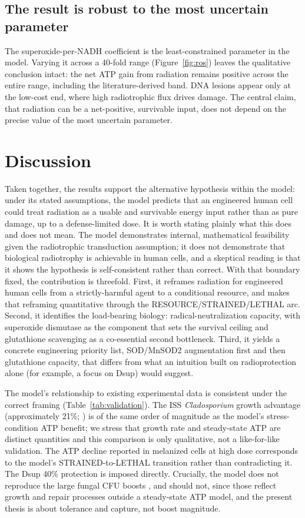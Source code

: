 \documentclass[11pt]{article}
\begin{document}
\subsection{The result is robust to the most uncertain parameter}

The superoxide-per-NADH coefficient is the least-constrained parameter in the
model. Varying it across a 40-fold range (Figure~\ref{fig:ros}) leaves the
qualitative conclusion intact: the net ATP gain from radiation remains positive
across the entire range, including the literature-derived band. DNA lesions appear
only at the low-cost end, where high radiotrophic flux drives damage. The central
claim, that radiation can be a net-positive, survivable input, does not depend on
the precise value of the most uncertain parameter.

\section{Discussion}

Taken together, the results support the alternative hypothesis within the model:
under its stated assumptions, the model predicts that an engineered human cell could
treat radiation as a usable and survivable energy input rather than as pure damage,
up to a defense-limited dose. It is worth stating plainly what this does and does
not mean. The model demonstrates internal, mathematical feasibility given the
radiotrophic transduction assumption; it does not demonstrate that biological
radiotrophy is achievable in human cells, and a skeptical reading is that it shows
the hypothesis is self-consistent rather than correct. With that boundary fixed,
the contribution is threefold. First, it reframes radiation for engineered human cells
from a strictly-harmful agent to a conditional resource, and makes that reframing
quantitative through the RESOURCE/STRAINED/LETHAL arc. Second, it identifies the
load-bearing biology: radical-neutralization capacity, with superoxide dismutase as
the component that sets the survival ceiling and glutathione scavenging as a
co-essential second bottleneck. Third, it yields a concrete engineering priority
list, SOD/MnSOD2 augmentation first and then glutathione capacity, that differs
from what an intuition built on radioprotection alone (for example, a focus on
Dsup) would suggest.

The model's relationship to existing experimental data is consistent under the
correct framing (Table~\ref{tab:validation}). The ISS \textit{Cladosporium} growth
advantage (approximately 21\%; \cite{shunk2022}) is of the same order of magnitude
as the model's stress-condition ATP benefit; we stress that growth rate and
steady-state ATP are distinct quantities and this comparison is only qualitative,
not a like-for-like validation. The ATP decline reported in melanized cells at
high dose \cite{bryan2011} corresponds to the model's STRAINED-to-LETHAL transition
rather than contradicting it. The Dsup 40\% protection \cite{hashimoto2016} is
imposed directly. Crucially, the model does not reproduce the large fungal CFU
boosts \cite{dadachova2007}, and should not, since those reflect growth and repair
processes outside a steady-state ATP model, and the present thesis is about
tolerance and capture, not boost magnitude.
\end{document}
